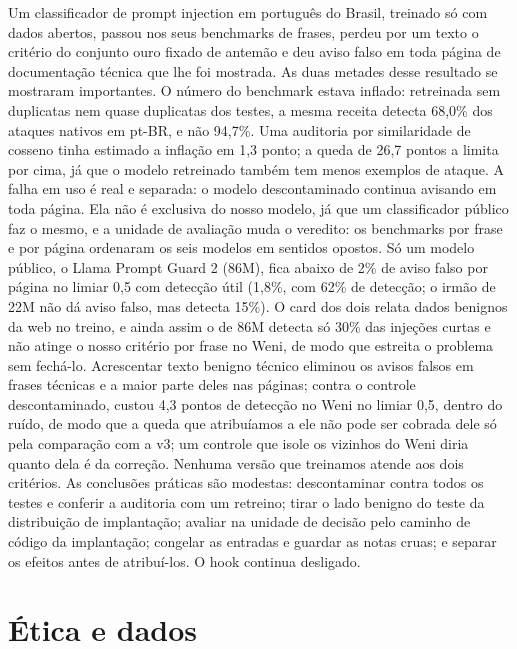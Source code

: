 \documentclass[11pt]{article}
\begin{document}
Um classificador de prompt injection em português do Brasil, treinado só com dados abertos, passou nos seus benchmarks de frases, perdeu por um texto o critério do conjunto ouro fixado de antemão e deu aviso falso em toda página de documentação técnica que lhe foi mostrada. As duas metades desse resultado se mostraram importantes. O número do benchmark estava inflado: retreinada sem duplicatas nem quase duplicatas dos testes, a mesma receita detecta 68,0\% dos ataques nativos em pt-BR, e não 94,7\%. Uma auditoria por similaridade de cosseno tinha estimado a inflação em 1,3 ponto; a queda de 26,7 pontos a limita por cima, já que o modelo retreinado também tem menos exemplos de ataque. A falha em uso é real e separada: o modelo descontaminado continua avisando em toda página. Ela não é exclusiva do nosso modelo, já que um classificador público faz o mesmo, e a unidade de avaliação muda o veredito: os benchmarks por frase e por página ordenaram os seis modelos em sentidos opostos. Só um modelo público, o Llama Prompt Guard 2 (86M), fica abaixo de 2\% de aviso falso por página no limiar 0,5 com detecção útil (1,8\%, com 62\% de detecção; o irmão de 22M não dá aviso falso, mas detecta 15\%). O card dos dois relata dados benignos da web no treino, e ainda assim o de 86M detecta só 30\% das injeções curtas e não atinge o nosso critério por frase no Weni, de modo que estreita o problema sem fechá-lo. Acrescentar texto benigno técnico eliminou os avisos falsos em frases técnicas e a maior parte deles nas páginas; contra o controle descontaminado, custou 4,3 pontos de detecção no Weni no limiar 0,5, dentro do ruído, de modo que a queda que atribuíamos a ele não pode ser cobrada dele só pela comparação com a v3; um controle que isole os vizinhos do Weni diria quanto dela é da correção. Nenhuma versão que treinamos atende aos dois critérios. As conclusões práticas são modestas: descontaminar contra todos os testes e conferir a auditoria com um retreino; tirar o lado benigno do teste da distribuição de implantação; avaliar na unidade de decisão pelo caminho de código da implantação; congelar as entradas e guardar as notas cruas; e separar os efeitos antes de atribuí-los. O hook continua desligado.

\section{Ética e dados}\label{sec:12}
\end{document}

